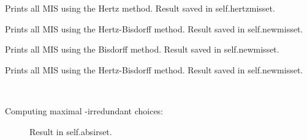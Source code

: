 \documentclass[letterpaper,10pt,english]{sphinxmanual}
\begin{document}
\begin{fulllineitems}

\begin{fulllineitems}
\label{techDoc:digraphs.Digraph.showMIS_AH}
Prints all MIS using the Hertz method.
Result saved in self.hertzmisset.

\end{fulllineitems}


\begin{fulllineitems}
\label{techDoc:digraphs.Digraph.showMIS_HB2}
Prints all MIS using the Hertz-Bisdorff method.
Result saved in self.newmisset.

\end{fulllineitems}


\begin{fulllineitems}
\label{techDoc:digraphs.Digraph.showMIS_RB}
Prints all MIS using the Bisdorff method.
Result saved in self.newmisset.

\end{fulllineitems}


\begin{fulllineitems}
\label{techDoc:digraphs.Digraph.showMIS_UD}
Prints all MIS using the Hertz-Bisdorff method.
Result saved in self.newmisset.

\end{fulllineitems}


\begin{fulllineitems}
\label{techDoc:digraphs.Digraph.showMaxAbsIrred}~\begin{description}
\item[{Computing maximal -irredundant choices:}] \leavevmode
Result in self.absirset.

\end{description}


\end{fulllineitems}
\end{fulllineitems}
\end{document}

